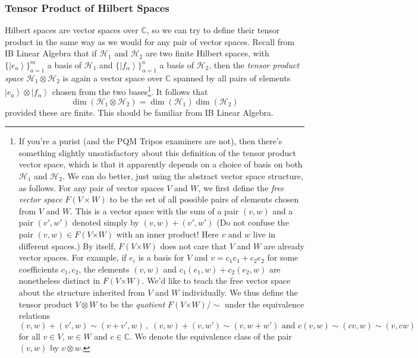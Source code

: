 \documentclass{article}
\theoremstyle{plain}\theoremheaderfont{\normalfont\itshape}\theorembodyfont{\rmfamily}\theoremseparator{.}\newtheorem*{rem}{Remark}\newtheorem*{ex}{Example}\newtheorem*{proof}{Proof}\newtheorem*{altp}{Alternative proof}
\theoremstyle{plain}\theoremheaderfont{\normalfont\bfseries}\theorembodyfont{\rmfamily}\theoremseparator{.}\newtheorem{thm}{Theorem}[section]\newtheorem{lem}[thm]{Lemma}\newtheorem{prop}[thm]{Proposition}\newtheorem*{cor}{Corollary}\newtheorem{defn}[thm]{Definition}\newtheorem{clm}[thm]{Claim}\newtheorem{clminproof}{Claim}
\theoremstyle{break}\theoremheaderfont{\normalfont\itshape}\theorembodyfont{\rmfamily}\theoremseparator{.\medskip}\newtheorem*{proofskip}{Proof}\newtheorem*{exs}{Examples}\newtheorem*{rems}{Remarks}
\theoremstyle{break}\theoremheaderfont{\normalfont\bfseries}\theorembodyfont{\rmfamily}\theoremseparator{.\medskip}\newtheorem{lemskip}[thm]{Lemma}\newtheorem{defnskip}[thm]{Definition}\newtheorem{propskip}[thm]{Proposition}\newtheorem{thmskip}[thm]{Theorem}
\numberwithin{equation}{section}
\newcommand{\ket}[1]{\left| #1 \right\rangle}
\newcommand{\cross}{\bm{\times}}
\newcommand{\hb}{\mathcal{H}}
\newcommand{\CC}{\mathbb{C}}
\begin{document}
    \subsubsection{Tensor Product of Hilbert Spaces}
    Hilbert spaces are vector spaces over \(\CC\), so we can try to define their tensor product in the same way as we would for any pair of vector spaces. Recall from IB Linear Algebra that if \(\hb_1\) and \(\hb_2\) are two finite Hilbert spaces, with \(\{\ket{e_a}\}_{a=1}^{m}\) a basis of \(\hb_1\) and \(\{\ket{f_\alpha}\}_{\alpha=1}^{n}\) a basis of \(\hb_2\), then the \textit{tensor product space} \(\hb_1\otimes\hb_2\) is again a vector space over \(\CC\) spanned by all pairs of elements \(\ket{e_a}\otimes\ket{f_\alpha}\) chosen from the two bases\footnote{If you're a purist (and the PQM Tripos examiners are not), then there's something slightly unsatisfactory about this definition of the tensor product vector space, which is that it apparently depends on a choice of basis on both \(\hb_1\) and \(\hb_2\). We can do better, just using the abstract vector space structure, as follows. For any pair of vector spaces \(V\) and \(W\), we first define the \textit{free vector space} \(F(V\times W)\) to be the set of all possible pairs of elements chosen from \(V\) and \(W\). This is a vector space with the sum of a pair \((v,w)\) and a pair \((v',w')\) denoted simply by \((v,w)+(v',w')\) (Do not confuse the pair \((v,w)\in F(V\cross W)\) with an inner product! Here \(v\) and \(w\) live in different spaces.) By itself, \(F(V\cross W)\) does not care that \(V\) and \(W\) are already vector spaces. For example, if \({e_i}\) is a basis for \(V\) and \(v=c_1e_1+c_2e_2\) for some coefficients \(c_1,c_2\), the elements \((v,w)\) and \(c_1(e_1,w)+c_2(e_2,w)\) are nonetheless distinct in \(F(V\cross W)\). We'd like to teach the free vector space about the structure inherited from \(V\) and \(W\) individually. We thus define the tensor product \(V\otimes W\) to be the \textit{quotient} \(F(V\cross W)/\sim\) under the equivalence relations
    \begin{equation}
        (v,w)+(v',w)\sim(v+v',w)\,,\; (v,w)+(v,w')\sim(v,w+w')\text{ and } c(v,w)\sim(cv,w)\sim(v,cw)
    \end{equation}
    for all \(v\in V\), \(w\in W\) and \(c\in\CC\). We denote the equivalence class of the pair \((v,w)\) by \(v\otimes w\).}. It follows that
    \begin{equation}
        \dim(\hb_1\otimes\hb_2)=\dim(\hb_1)\dim(\hb_2)
    \end{equation}
    provided these are finite. This should be familiar from IB Linear Algebra.
\end{document}
